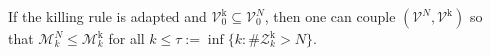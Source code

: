 \begin{lemma}[Lemma 3.17]
If the killing rule is adapted and $\mathcal V^{\mathrm k}_0\subseteq\mathcal V^N_0$, then one can couple $(\mathcal V^N,\mathcal V^{\mathrm k})$ so that $\mathcal M^N_k\le\mathcal M^{\mathrm k}_k$ for all $k\le\tau:=\inf\{k:\#\mathcal Z^{\mathrm k}_k>N\}$.
\end{lemma}
